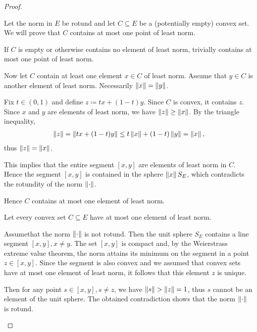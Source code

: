\begin{proof}
  \begin{description}
     Let the norm in \( E \) be rotund and let \( C \subseteq E \) be a (potentially empty) convex set. We will prove that \( C \) contains at most one point of least norm.

    If \( C \) is empty or otherwise contains no element of least norm, trivially contains at most one point of least norm.

    Now let \( C \) contain at least one element \( x \in C \) of least norm. Assume that \( y \in C \) is another element of least norm. Necessarily \( \left\Vert x \right\Vert = \left\Vert y \right\Vert \).

    Fix \( t \in (0, 1) \) and define \( z \coloneqq tx + (1-t)y \). Since \( C \) is convex, it contains \( z \). Since \( x \) and \( y \) are elements of least norm, we have \( \left\Vert z \right\Vert \geq \left\Vert x \right\Vert \). By the triangle inequality,
    \begin{align*}
      \left\Vert z \right\Vert
      =
      \left\Vert tx + (1-t)y \right\Vert
      \leq
      t \left\Vert x \right\Vert + (1-t) \left\Vert y \right\Vert
      =
      \left\Vert x \right\Vert,
    \end{align*}
    thus \( \left\Vert z \right\Vert = \left\Vert x \right\Vert \).

    This implies that the entire segment \( [x, y] \) are elements of least norm in \( C \). Hence the segment \( [x, y] \) is contained in the sphere \( \left\Vert x \right\Vert S_E \), which contradicts the rotundity of the norm \( \left\Vert \cdot \right\Vert \).

    Hence \( C \) contains at most one element of least norm.

     Let every convex set \( C \subseteq E \) have at most one element of least norm.

    Assume\LEM that the norm \( \left\Vert \cdot \right\Vert \) is not rotund. Then the unit sphere \( S_E \) contains a line segment \( [x, y], x \neq y \). The set \( [x, y] \) is compact and, by the Weierstrass extreme value theorem, the norm attains its minimum on the segment in a point \( z \in [x, y] \). Since the segment is also convex and we assumed that convex sets have at most one element of least norm, it follows that this element \( z \) is unique.

    Then for any point \( s \in [x, y], s \neq z \), we have \( \left\Vert s \right\Vert > \left\Vert z \right\Vert = 1 \), thus \( s \) cannot be an element of the unit sphere. The obtained contradiction shows that the norm \( \left\Vert \cdot \right\Vert \) is rotund.


\end{description}
\end{proof}
